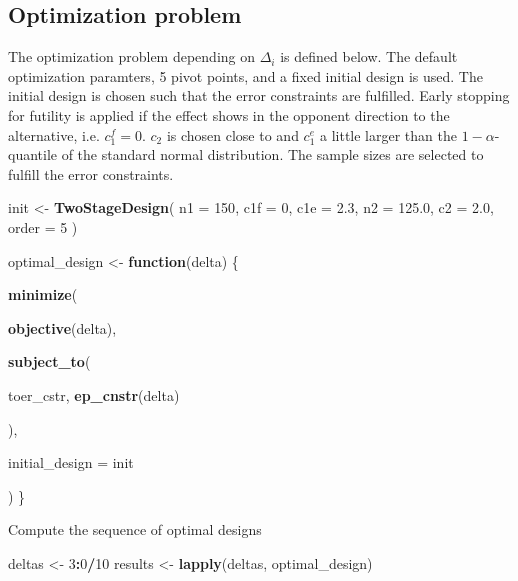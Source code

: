 \documentclass[]{book}
\newenvironment{Shaded}{\begin{snugshade}}{\end{snugshade}}
\newcommand{\ControlFlowTok}[1]{\textcolor[rgb]{0.13,0.29,0.53}{\textbf{#1}}}
\newcommand{\DataTypeTok}[1]{\textcolor[rgb]{0.13,0.29,0.53}{#1}}
\newcommand{\DecValTok}[1]{\textcolor[rgb]{0.00,0.00,0.81}{#1}}
\newcommand{\FloatTok}[1]{\textcolor[rgb]{0.00,0.00,0.81}{#1}}
\newcommand{\KeywordTok}[1]{\textcolor[rgb]{0.13,0.29,0.53}{\textbf{#1}}}
\newcommand{\NormalTok}[1]{#1}
\newcommand{\OperatorTok}[1]{\textcolor[rgb]{0.81,0.36,0.00}{\textbf{#1}}}
\newcommand{\StringTok}[1]{\textcolor[rgb]{0.31,0.60,0.02}{#1}}
\begin{document}
\hypertarget{optimization-problem}{%
\subsection{Optimization problem}\label{optimization-problem}}

The optimization problem depending on \(\Delta_i\) is defined below.
The default optimization paramters, 5 pivot points, and a fixed initial design
is used.
The initial design is chosen such that the error constraints are
fulfilled. Early stopping for futility is applied if the effect shows
in the opponent direction to the alternative, i.e. \(c_1^f=0\).
\(c_2\) is chosen close to and \(c_1^e\) a little larger than the \(1-\alpha\)-quantile
of the standard normal distribution. The sample sizes are selected
to fulfill the error constraints.

\begin{Shaded}
\begin{Highlighting}[]
\NormalTok{init <-}\StringTok{ }\KeywordTok{TwoStageDesign}\NormalTok{(}
    \DataTypeTok{n1    =} \DecValTok{150}\NormalTok{,}
    \DataTypeTok{c1f   =} \DecValTok{0}\NormalTok{,}
    \DataTypeTok{c1e   =} \FloatTok{2.3}\NormalTok{,}
    \DataTypeTok{n2    =} \FloatTok{125.0}\NormalTok{,}
    \DataTypeTok{c2    =} \FloatTok{2.0}\NormalTok{,}
    \DataTypeTok{order =} \DecValTok{5}
\NormalTok{)}

\NormalTok{optimal_design <-}\StringTok{ }\ControlFlowTok{function}\NormalTok{(delta) \{}
    
    \KeywordTok{minimize}\NormalTok{(}
        
        \KeywordTok{objective}\NormalTok{(delta),}
        
        \KeywordTok{subject_to}\NormalTok{(}
            
\NormalTok{            toer_cstr,}
            \KeywordTok{ep_cnstr}\NormalTok{(delta)}
            
\NormalTok{        ),}
        
        \DataTypeTok{initial_design =}\NormalTok{ init}
        
\NormalTok{    )}
\NormalTok{\}}
\end{Highlighting}
\end{Shaded}

Compute the sequence of optimal designs

\begin{Shaded}
\begin{Highlighting}[]
\NormalTok{deltas  <-}\StringTok{ }\DecValTok{3}\OperatorTok{:}\DecValTok{0}\OperatorTok{/}\DecValTok{10}
\NormalTok{results <-}\StringTok{ }\KeywordTok{lapply}\NormalTok{(deltas, optimal_design)}
\end{Highlighting}
\end{Shaded}
\end{document}
